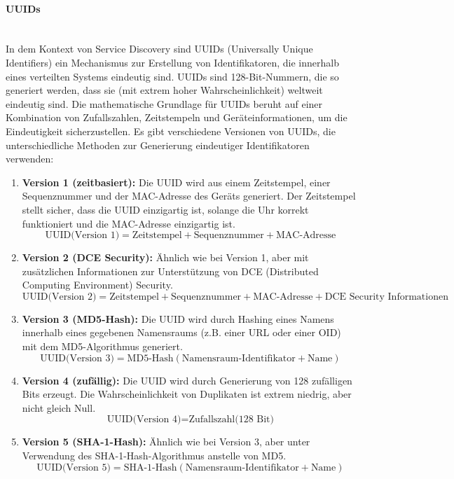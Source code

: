 \documentclass[../vs-script-first-v01.tex]{subfiles}
\begin{document}
\paragraph{UUIDs}\mbox{}\\
In dem Kontext von Service Discovery sind UUIDs (Universally Unique Identifiers) ein Mechanismus zur Erstellung von Identifikatoren, die innerhalb eines verteilten Systems eindeutig sind. UUIDs sind 128-Bit-Nummern, die so generiert werden, dass sie (mit extrem hoher Wahrscheinlichkeit) weltweit eindeutig sind. Die mathematische Grundlage für UUIDs beruht auf einer Kombination von Zufallszahlen, Zeitstempeln und Geräteinformationen, um die Eindeutigkeit sicherzustellen.
Es gibt verschiedene Versionen von UUIDs, die unterschiedliche Methoden zur Generierung eindeutiger Identifikatoren verwenden:

\begin{enumerate}
    \item \textbf{Version 1 (zeitbasiert):} Die UUID wird aus einem Zeitstempel, einer Sequenznummer und der MAC-Adresse des Geräts generiert. Der Zeitstempel stellt sicher, dass die UUID einzigartig ist, solange die Uhr korrekt funktioniert und die MAC-Adresse einzigartig ist.
    \begin{equation}
        \text{UUID(Version 1)} = \text{Zeitstempel} + \text{Sequenznummer} + \text{MAC-Adresse}
    \end{equation}
    \item \textbf{Version 2 (DCE Security):} Ähnlich wie bei Version 1, aber mit zusätzlichen Informationen zur Unterstützung von DCE (Distributed Computing Environment) Security.
    \begin{equation}
        \text{UUID(Version 2)} = \text{Zeitstempel} + \text{Sequenznummer} + \text{MAC-Adresse} + \text{DCE Security Informationen}
    \end{equation}
    \item \textbf{Version 3 (MD5-Hash):} Die UUID wird durch Hashing eines Namens innerhalb eines gegebenen Namensraums (z.B. einer URL oder einer OID) mit dem MD5-Algorithmus generiert.
    \begin{equation}
        \text{UUID(Version 3)} = \text{MD5-Hash}(\text{Namensraum-Identifikator} + \text{Name})
    \end{equation}
    \item \textbf{Version 4 (zufällig):} Die UUID wird durch Generierung von 128 zufälligen Bits erzeugt. Die Wahrscheinlichkeit von Duplikaten ist extrem niedrig, aber nicht gleich Null.
    \begin{equation}
        \text{UUID(Version 4)} = \text{Zufallszahl(128 Bit)}
    \end{equation}
    \item \textbf{Version 5 (SHA-1-Hash):} Ähnlich wie bei Version 3, aber unter Verwendung des SHA-1-Hash-Algorithmus anstelle von MD5.
    \begin{equation}
        \text{UUID(Version 5)} = \text{SHA-1-Hash}(\text{Namensraum-Identifikator} + \text{Name})
    \end{equation}
\end{enumerate}
\end{document}

